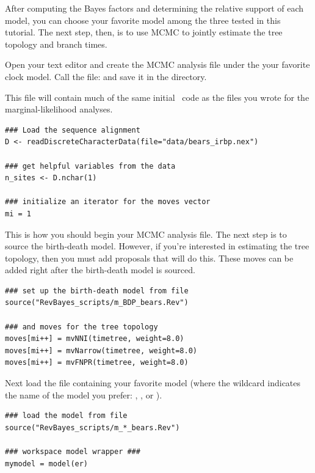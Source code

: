 After computing the Bayes factors and determining the relative support of each model, you can choose your favorite model among the three tested in this tutorial. 
The next step, then, is to use MCMC to jointly estimate the tree topology and branch times. 

{\begin{framed}
Open your text editor and create the MCMC analysis file under the your favorite clock model. Call the file: {\textcolor{red}{}} and save it in the  directory.
\end{framed}}

This file will contain much of the same initial \Rev~code as the files you wrote for the marginal-likelihood analyses. 

{\tt \begin{snugshade*}
\begin{lstlisting}
### Load the sequence alignment
D <- readDiscreteCharacterData(file="data/bears_irbp.nex")

### get helpful variables from the data
n_sites <- D.nchar(1)

### initialize an iterator for the moves vector
mi = 1
\end{lstlisting}
\end{snugshade*}}

This is how you should begin your MCMC analysis file. The next step is to source the birth-death model. 
However, if you're interested in estimating the tree topology, then you must add proposals that will do this.
These moves can be added right after the birth-death model is sourced.
{\tt \begin{snugshade*}
\begin{lstlisting}
### set up the birth-death model from file
source("RevBayes_scripts/m_BDP_bears.Rev")

### and moves for the tree topology
moves[mi++] = mvNNI(timetree, weight=8.0)
moves[mi++] = mvNarrow(timetree, weight=8.0)
moves[mi++] = mvFNPR(timetree, weight=8.0)
\end{lstlisting}
\end{snugshade*}}

Next load the file containing your favorite model (where the wildcard \cl{*} indicates the name of the model you prefer: , , or ).
{\tt \begin{snugshade*}
\begin{lstlisting}
### load the model from file 
source("RevBayes_scripts/m_*_bears.Rev")

### workspace model wrapper ###
mymodel = model(er)
\end{lstlisting}
\end{snugshade*}}

